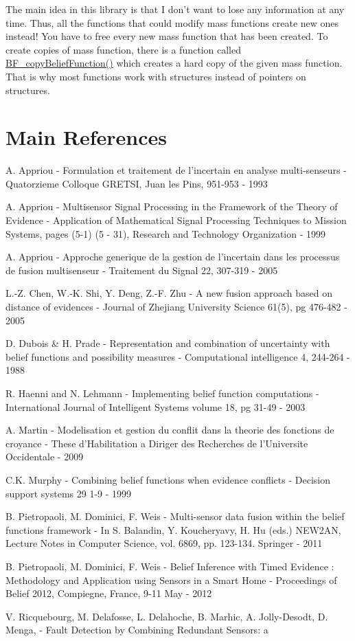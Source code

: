 The main idea in this library is that I don't want to lose any information at any time. Thus, all the functions that could modify mass functions create new ones instead! You have to free every new mass function that has been created. To create copies of mass function, there is a function called \hyperlink{_belief_functions_8c_ae248331ed725fe2bbba71abc0b397aab}{B\-F\-\_\-copy\-Belief\-Function()} which creates a hard copy of the given mass function. That is why most functions work with structures instead of pointers on structures.\hypertarget{index_ref_sec}{}\section{Main References}\label{index_ref_sec}
\begin{DoxyItemize}
\item A. Appriou -\/ Formulation et traitement de l'incertain en analyse multi-\/senseurs -\/ Quatorzieme Colloque G\-R\-E\-T\-S\-I, Juan les Pins, 951-\/953 -\/ 1993 \item A. Appriou -\/ Multisensor Signal Processing in the Framework of the Theory of Evidence -\/ Application of Mathematical Signal Processing Techniques to Mission Systems, pages (5-\/1) (5 -\/ 31), Research and Technology Organization -\/ 1999 \item A. Appriou -\/ Approche generique de la gestion de l'incertain dans les processus de fusion multisenseur -\/ Traitement du Signal 22, 307-\/319 -\/ 2005 \item L.-\/\-Z. Chen, W.-\/\-K. Shi, Y. Deng, Z.-\/\-F. Zhu -\/ A new fusion approach based on distance of evidences -\/ Journal of Zhejiang University Science 61(5), pg 476-\/482 -\/ 2005 \item D. Dubois \& H. Prade -\/ Representation and combination of uncertainty with belief functions and possibility measures -\/ Computational intelligence 4, 244-\/264 -\/ 1988 \item R. Haenni and N. Lehmann -\/ Implementing belief function computations -\/ International Journal of Intelligent Systems volume 18, pg 31-\/49 -\/ 2003 \item A. Martin -\/ Modelisation et gestion du conflit dans la theorie des fonctions de croyance -\/ These d'Habilitation a Diriger des Recherches de l'Universite Occidentale -\/ 2009 \item C.\-K. Murphy -\/ Combining belief functions when evidence conflicts -\/ Decision support systems 29 1-\/9 -\/ 1999 \item B. Pietropaoli, M. Dominici, F. Weis -\/ Multi-\/sensor data fusion within the belief functions framework -\/ In S. Balandin, Y. Koucheryavy, H. Hu (eds.) N\-E\-W2\-A\-N, Lecture Notes in Computer Science, vol. 6869, pp. 123-\/134. Springer -\/ 2011 \item B. Pietropaoli, M. Dominici, F. Weis -\/ Belief Inference with Timed Evidence \-: Methodology and Application using Sensors in a Smart Home -\/ Proceedings of Belief 2012, Compiegne, France, 9-\/11 May -\/ 2012 \item V. Ricquebourg, M. Delafosse, L. Delahoche, B. Marhic, A. Jolly-\/\-Desodt, D. Menga, -\/ Fault Detection by Combining Redundant Sensors\-: a 
\end{DoxyItemize}
